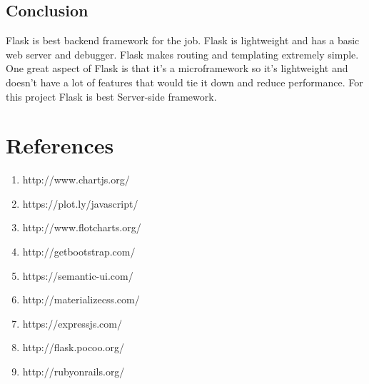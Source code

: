 \documentclass[onecolumn, draftclsnofoot,10pt, compsoc]{IEEEtran}
\begin{document}
\subsection{Conclusion}
Flask is best backend framework for the job. Flask is lightweight and has a basic web server and debugger. Flask makes routing and templating extremely simple. One great aspect of Flask is that it’s a microframework so it’s lightweight and doesn’t have a lot of features that would tie it down and reduce performance. For this project Flask is best Server-side framework.

\section{References}
\begin{enumerate}
\item http://www.chartjs.org/
\item https://plot.ly/javascript/
\item http://www.flotcharts.org/
\item http://getbootstrap.com/
\item https://semantic-ui.com/
\item http://materializecss.com/
\item https://expressjs.com/
\item http://flask.pocoo.org/
\item http://rubyonrails.org/ 
 \end{enumerate}
\end{document}

